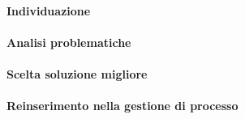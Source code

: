 		\paragraph{Individuazione}
		\paragraph{Analisi problematiche}
		\paragraph{Scelta soluzione migliore}
		\paragraph{Reinserimento nella gestione di processo}
	








